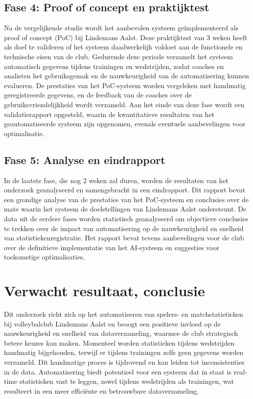 \subsection{Fase 4: Proof of concept en praktijktest}
Na de vergelijkende studie wordt het aanbevolen systeem geïmplementeerd als proof of concept (PoC) bij Lindemans Aalst. Deze praktijktest van 3 weken heeft als doel te valideren of het systeem daadwerkelijk voldoet aan de functionele en technische eisen van de club. Gedurende deze periode verzamelt het systeem automatisch gegevens tijdens trainingen en wedstrijden, zodat coaches en analisten het gebruiksgemak en de nauwkeurigheid van de automatisering kunnen evalueren. De prestaties van het PoC-systeem worden vergeleken met handmatig geregistreerde gegevens, en de feedback van de coaches over de gebruiksvriendelijkheid wordt verzameld. Aan het einde van deze fase wordt een validatierapport opgesteld, waarin de kwantitatieve resultaten van het geautomatiseerde systeem zijn opgenomen, evenals eventuele aanbevelingen voor optimalisatie.
\subsection{Fase 5: Analyse en eindrapport}
In de laatste fase, die nog 2 weken zal duren, worden de resultaten van het onderzoek geanalyseerd en samengebracht in een eindrapport. Dit rapport bevat een grondige analyse van de prestaties van het PoC-systeem en conclusies over de mate waarin het systeem de doelstellingen van Lindemans Aalst ondersteunt. De data uit de eerdere fases worden statistisch geanalyseerd om objectieve conclusies te trekken over de impact van automatisering op de nauwkeurigheid en snelheid van statistiekenregistratie. Het rapport bevat tevens aanbevelingen voor de club over de definitieve implementatie van het AI-systeem en suggesties voor toekomstige optimalisaties.

\section{Verwacht resultaat, conclusie}%
\label{sec:verwachte_resultaten}
Dit onderzoek richt zich op het automatiseren van spelers- en matchstatistieken bij volleybalclub Lindemans Aalst en beoogt een positieve invloed op de nauwkeurigheid en snelheid van dataverzameling, waarmee de club strategisch betere keuzes kan maken. Momenteel worden statistieken tijdens wedstrijden handmatig bijgehouden, terwijl er tijdens trainingen zelfs geen gegevens worden verzameld. Dit handmatige proces is tijdrovend en kan leiden tot inconsistenties in de data. Automatisering biedt potentieel voor een systeem dat in staat is real-time statistieken vast te leggen, zowel tijdens wedstrijden als trainingen, wat resulteert in een meer efficiënte en betrouwbare dataverzameling.

